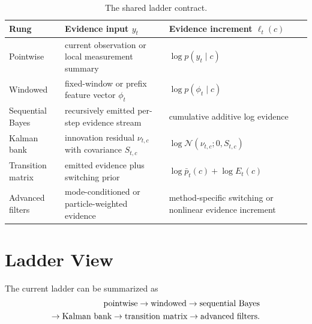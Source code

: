 \documentclass[11pt]{article}
\begin{document}
\begin{table}[htbp]
\centering
\caption{The shared ladder contract.}
\label{tab:ladder_contract}
\begin{tabularx}{\textwidth}{@{}lXX@{}}
\toprule
Rung & Evidence input \(y_t\) & Evidence increment \(\ell_t(c)\) \\
\midrule
Pointwise & current observation or local measurement summary & \(\log p(y_t \mid c)\) \\
Windowed & fixed-window or prefix feature vector \(\phi_t\) & \(\log p(\phi_t \mid c)\) \\
Sequential Bayes & recursively emitted per-step evidence stream & cumulative additive log evidence \\
Kalman bank & innovation residual \(\nu_{t,c}\) with covariance \(S_{t,c}\) & \(\log \mathcal{N}(\nu_{t,c}; 0, S_{t,c})\) \\
Transition matrix & emitted evidence plus switching prior & \(\log \bar{p}_t(c) + \log E_t(c)\) \\
Advanced filters & mode-conditioned or particle-weighted evidence & method-specific switching or nonlinear evidence increment \\
\bottomrule
\end{tabularx}
\end{table}

\section{Ladder View}
The current ladder can be summarized as
\begin{align}
\text{pointwise}
\rightarrow
\text{windowed}
\rightarrow
\text{sequential Bayes}
\notag \\
\rightarrow
\text{Kalman bank}
\rightarrow
\text{transition matrix}
\rightarrow
\text{advanced filters}.
\end{align}
\end{document}
